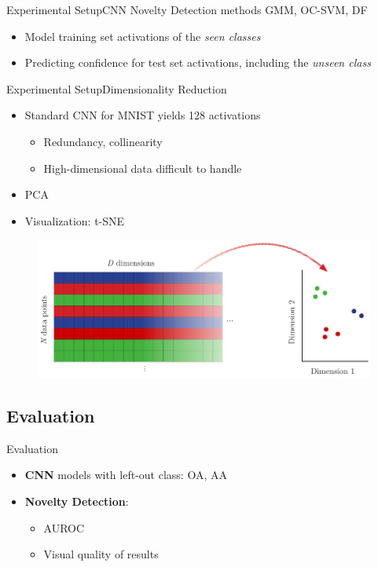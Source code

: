 \documentclass{beamer}
\begin{document}
\begin{frame}{Experimental Setup}{CNN}
	Novelty Detection methods \gls{GMM}, \gls{OC-SVM}, \gls{DF}
	\begin{itemize}
		\item Model training set activations of the \textit{seen classes} 
		\item Predicting confidence for test set activations, including the \textit{unseen class}
	\end{itemize}
\end{frame}

\begin{frame}{Experimental Setup}{Dimensionality Reduction}
	\begin{itemize}
		\item Standard \gls{CNN} for \gls{MNIST} yields 128 activations\\
		\begin{itemize}
			\item Redundancy, collinearity
			\item High-dimensional data difficult to handle
		\end{itemize}
		\item \gls{PCA}
		\item Visualization: \gls{t-SNE}
	\end{itemize}
	
	\begin{figure}[H]
		\centering
		\includegraphics[width=.8\textwidth]{t-SNE-schema}
	\end{figure}
\end{frame}



\subsection{Evaluation}
\begin{frame}{Evaluation}
	\begin{itemize}
		\item \textbf{\gls{CNN}} models with left-out class: \gls{OA}, \gls{AA}
		\item \textbf{Novelty Detection}:
		\begin{itemize}
			\item \gls{AUROC}
			\item Visual quality of results
		\end{itemize}
	\end{itemize}
\end{frame}
\end{document}
